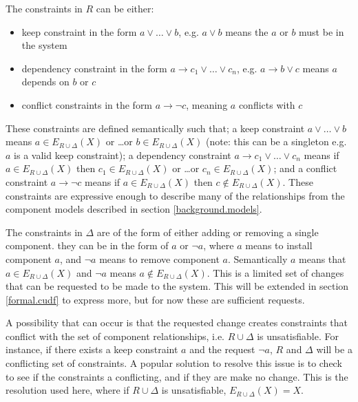 The constraints in $R$ can be either: 
\begin{itemize}
  \item keep constraint in the form $a \vee \ldots \vee b$, e.g. $a \vee b$ means the $a$ or $b$ must be in the system
  \item dependency constraint in the form $a \rightarrow c_1 \vee \ldots \vee c_n$, e.g. $a \rightarrow b \vee c$ means $a$ depends on $b$ or $c$
  \item conflict constraints in the form $a \rightarrow \neg c$, meaning $a$ conflicts with $c$
\end{itemize}
These constraints are defined semantically such that;
a keep constraint  $a \vee \ldots \vee b$ means $a \in E_{R \cup \Delta}(X)$ or \ldots or $b \in E_{R \cup \Delta}(X)$ (note: this can be a singleton e.g. $a$ is a valid keep constraint);
a dependency constraint $a \rightarrow c_1 \vee \ldots \vee c_n$ means if $a \in E_{R \cup \Delta}(X)$ then $c_1 \in E_{R \cup \Delta}(X)$ or \ldots or $c_n \in E_{R \cup \Delta}(X)$;
and a conflict constraint $a \rightarrow \neg c$ means if $a \in E_{R \cup \Delta}(X)$ then $c \not \in E_{R \cup \Delta}(X)$.
These constraints are expressive enough to describe many of the relationships from the component models described in section \ref{background.models}.

The constraints in $\Delta$ are of the form of either adding or removing a single component.
they can be in the form of $a$ or $\neg a$, where $a$ means to install component $a$, and $\neg a$ means to remove component $a$.
Semantically $a$ means that $a \in E_{R \cup \Delta}(X)$ and $\neg a$ means $a \not \in E_{R \cup \Delta}(X)$. 
This is a limited set of changes that can be requested to be made to the system.
This will be extended in section \ref{formal.cudf} to express more, but for now these are sufficient requests.

A possibility that can occur is that the requested change creates constraints that conflict with the set of component relationships,
i.e. $R \cup \Delta$ is unsatisfiable.
For instance, if there exists a keep constraint $a$ and the request $\neg a$, $R$ and $\Delta$ will be a conflicting set of constraints.   
A popular solution to resolve this issue is to check to see if the constraints a conflicting, and if they are make no change.
This is the resolution used here,
where if $R \cup \Delta$ is unsatisfiable, $E_{R \cup \Delta}(X) = X$.

